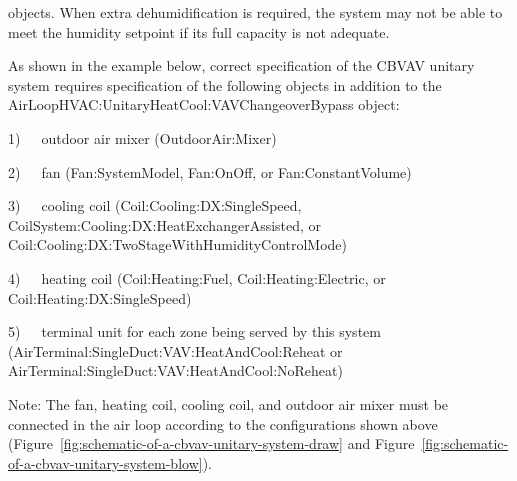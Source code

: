 objects. When extra dehumidification is required, the system may not be able to meet the humidity setpoint if its full capacity is not adequate.

As shown in the example below, correct specification of the CBVAV unitary system requires specification of the following objects in addition to the AirLoopHVAC:UnitaryHeatCool:VAVChangeoverBypass object:

1)~~~outdoor air mixer (OutdoorAir:Mixer)

2)~~~fan (Fan:SystemModel, Fan:OnOff, or Fan:ConstantVolume)

3)~~~cooling coil (Coil:Cooling:DX:SingleSpeed, CoilSystem:Cooling:DX:HeatExchangerAssisted, or Coil:Cooling:DX:TwoStageWithHumidityControlMode)

4)~~~heating coil (Coil:Heating:Fuel, Coil:Heating:Electric, or Coil:Heating:DX:SingleSpeed)

5)~~~terminal unit for each zone being served by this system (AirTerminal:SingleDuct:VAV:HeatAndCool:Reheat or AirTerminal:SingleDuct:VAV:HeatAndCool:NoReheat)

Note: The fan, heating coil, cooling coil, and outdoor air mixer must be connected in the air loop according to the configurations shown above (Figure~\ref{fig:schematic-of-a-cbvav-unitary-system-draw} and Figure~\ref{fig:schematic-of-a-cbvav-unitary-system-blow}).

